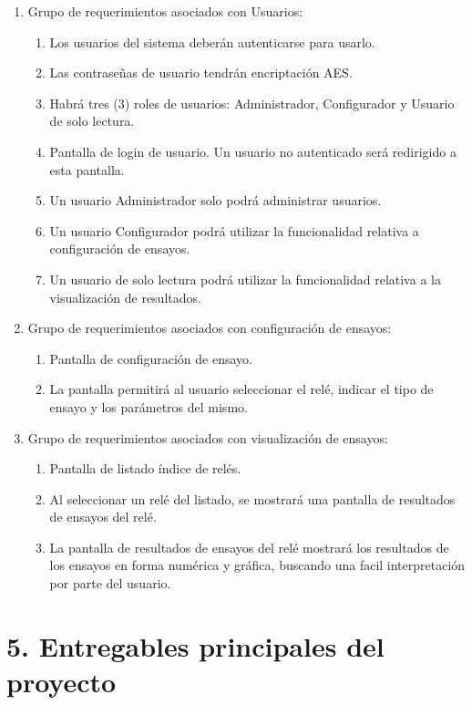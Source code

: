 \documentclass[11pt]{charter}
\begin{document}
\begin{enumerate}
\item Grupo de requerimientos asociados con Usuarios:
	\begin{enumerate}
	\item Los usuarios del sistema deberán autenticarse para usarlo.
	\item Las contraseñas de usuario tendrán encriptación AES.
	\item Habrá tres (3) roles de usuarios: Administrador, Configurador y Usuario de solo lectura.
	\item Pantalla de login de usuario. Un usuario no autenticado será redirigido a esta pantalla.
	\item Un usuario Administrador solo podrá administrar usuarios.
	\item Un usuario Configurador podrá utilizar la funcionalidad relativa a configuración de ensayos. 
	\item Un usuario de solo lectura podrá utilizar la funcionalidad relativa a la visualización de resultados.
	\end{enumerate}
\item Grupo de requerimientos asociados con configuración de ensayos:
	\begin{enumerate}
	\item Pantalla de configuración de ensayo.
	\item La pantalla permitirá al usuario seleccionar el relé, indicar el tipo de ensayo y los parámetros del mismo.
	\end{enumerate}
\item Grupo de requerimientos asociados con visualización de ensayos:
	\begin{enumerate}
	\item Pantalla de listado índice de relés.
	\item Al seleccionar un relé del listado, se mostrará una pantalla de resultados de ensayos del relé.
	\item La pantalla de resultados de ensayos del relé mostrará los resultados de los ensayos en forma numérica y gráfica, buscando una facil interpretación por parte del usuario.
	\end{enumerate}
	
\end{enumerate}

\section{5. Entregables principales del proyecto}
\label{sec:entregables}
\end{document}
